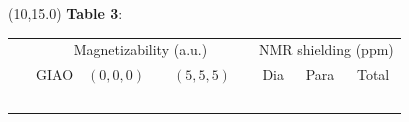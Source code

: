 \documentclass[a0,draft,portrait]{a0poster}
\begin{document}
\begin{textblock}{7}(10,15.0)
\footnotesize
\textbf{Table 3}:
\begin{table}
    \normalsize
    \centering
    \begin{tabular}{|r|crr|ccc|}
\hline                   & \multicolumn{3}{c|}{Magnetizability (a.u.)}   &\multicolumn{3}{c|}{NMR shielding (ppm)}            \\
                         & GIAO          & $(0,0,0)$\ \  & $(5,5,5)$\ \  & Dia             & Para             & Total    \\
\hline  \hspace{55mm}\   &\hspace{40mm}\ &\hspace{40mm}\ &\hspace{40mm}\ &\hspace{40mm}\ &\hspace{40mm}\ &\hspace{40mm}\ \\

\end{tabular}
\end{table}
\end{textblock}
\end{document}
